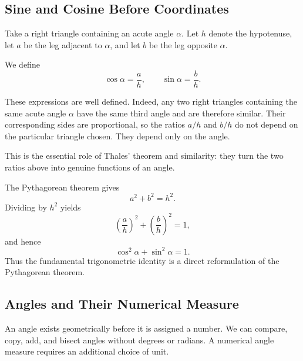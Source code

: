 \subsection{Sine and Cosine Before Coordinates}

Take a right triangle containing an acute angle $\alpha$. Let $h$ denote the
hypotenuse, let $a$ be the leg adjacent to $\alpha$, and let $b$ be the leg
opposite $\alpha$.

\begin{center}
\end{center}

We define
\[
\cos\alpha=\frac{a}{h},
\qquad
\sin\alpha=\frac{b}{h}.
\]

These expressions are well defined. Indeed, any two right triangles containing
the same acute angle $\alpha$ have the same third angle and are therefore
similar. Their corresponding sides are proportional, so the ratios $a/h$ and
$b/h$ do not depend on the particular triangle chosen. They depend only on the
angle.

This is the essential role of Thales' theorem and similarity: they turn the two
ratios above into genuine functions of an angle.

The Pythagorean theorem gives
\[
a^2+b^2=h^2.
\]
Dividing by $h^2$ yields
\[
\left(\frac{a}{h}\right)^2+
\left(\frac{b}{h}\right)^2=1,
\]
and hence
\[
\cos^2\alpha+\sin^2\alpha=1.
\]
Thus the fundamental trigonometric identity is a direct reformulation of the
Pythagorean theorem.

\subsection{Angles and Their Numerical Measure}

An angle exists geometrically before it is assigned a number. We can compare,
copy, add, and bisect angles without degrees or radians. A numerical angle
measure requires an additional choice of unit.

